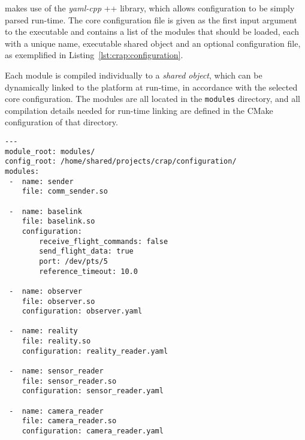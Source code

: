         \crap makes use of the \textit{yaml-cpp} \C++ library, which allows
        configuration to be simply parsed run-time. The core configuration
        file is given as the first input argument to the \crap executable
        and contains a list of the modules that should be loaded, each with
        a unique name, executable shared object and an optional configuration file,
        as exemplified in Listing~\ref{lst:crap:configuration}.

        Each module is compiled individually to a \textit{shared object},
        which can be dynamically linked to the \crap platform at run-time, in accordance
        with the selected core configuration.
        The modules are all located in the \texttt{modules} directory,
        and all compilation details needed for run-time linking are defined in the CMake
        configuration of that directory.

        \begin{minipage}{\textwidth}
        \begin{lstlisting}
---
module_root: modules/
config_root: /home/shared/projects/crap/configuration/
modules:
 -  name: sender
    file: comm_sender.so

 -  name: baselink
    file: baselink.so
    configuration:
        receive_flight_commands: false
        send_flight_data: true
        port: /dev/pts/5
        reference_timeout: 10.0

 -  name: observer
    file: observer.so
    configuration: observer.yaml

 -  name: reality
    file: reality.so
    configuration: reality_reader.yaml

 -  name: sensor_reader
    file: sensor_reader.so
    configuration: sensor_reader.yaml

 -  name: camera_reader
    file: camera_reader.so
    configuration: camera_reader.yaml
        \end{lstlisting}
        \end{minipage}

